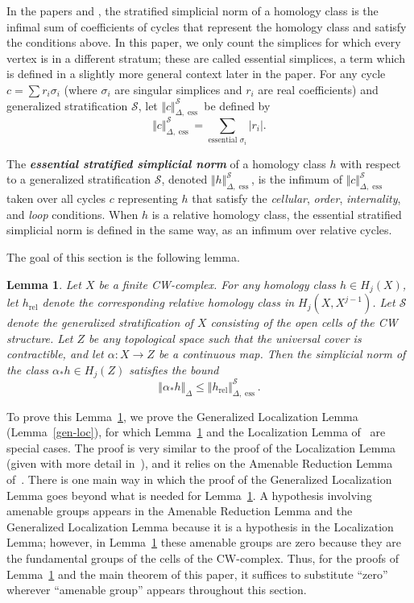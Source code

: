 \documentclass[psamsfonts]{amsart}
\newtheorem{lemma}[theorem]{Lemma}
\theoremstyle{remark}
\newcommand{\abs}[1]{\left\lvert #1 \right\rvert}
\DeclareMathOperator{\ess}{ess}
\DeclareMathOperator{\rel}{rel}
\begin{document}
In the papers \cite{Gromov09} and \cite{Alpert15}, the stratified simplicial norm of a homology class is the infimal sum of coefficients of cycles that represent the homology class and satisfy the conditions above.  In this paper, we only count the simplices for which every vertex is in a different stratum; these are called essential simplices, a term which is defined in a slightly more general context later in the paper.  For any cycle $c = \sum r_i \sigma_i$ (where $\sigma_i$ are singular simplices and $r_i$ are real coefficients) and generalized stratification $\mathcal{S}$, let $\Vert c \Vert_{\Delta, \ess}^{\mathcal{S}}$ be defined by
\[\Vert c \Vert_{\Delta, \ess}^{\mathcal{S}} = \sum_{\text{essential }\sigma_i} \abs{r_i}.\]

The \textbf{\emph{essential stratified simplicial norm}} of a homology class $h$ with respect to a generalized stratification $\mathcal{S}$, denoted $\Vert h \Vert_{\Delta, \ess}^{\mathcal{S}}$, is the infimum of $\Vert c \Vert_{\Delta, \ess}^{\mathcal{S}}$ taken over all cycles $c$ representing $h$ that satisfy the \emph{cellular}, \emph{order}, \emph{internality}, and \emph{loop} conditions.  When $h$ is a relative homology class, the essential stratified simplicial norm is defined in the same way, as an infimum over relative cycles.

The goal of this section is the following lemma.

\begin{lemma}\label{simplicial-goal}
Let $X$ be a finite CW-complex.  For any homology class $h \in H_j(X)$, let $h_{\rel}$ denote the corresponding relative homology class in $H_j(X, X^{j-1})$.  Let $\mathcal{S}$ denote the generalized stratification of $X$ consisting of the open cells of the CW structure.  Let $Z$ be any topological space such that the universal cover is contractible, and let $\alpha : X \rightarrow Z$ be a continuous map.  Then the simplicial norm of the class $\alpha_*h \in H_j(Z)$ satisfies the bound
\[\Vert \alpha_* h \Vert_{\Delta} \leq \Vert h_{\rel} \Vert_{\Delta, \ess}^{\mathcal{S}}.\]
\end{lemma}

To prove this Lemma~\ref{simplicial-goal}, we prove the Generalized Localization Lemma (Lemma~\ref{gen-loc}), for which Lemma~\ref{simplicial-goal} and the Localization Lemma of~\cite{Gromov09} are special cases.  The proof is very similar to the proof of the Localization Lemma (given with more detail in~\cite{Alpert15}), and it relies on the Amenable Reduction Lemma of~\cite{Gromov09}.  There is one main way in which the proof of the Generalized Localization Lemma goes beyond what is needed for Lemma~\ref{simplicial-goal}.  A hypothesis involving amenable groups appears in the Amenable Reduction Lemma and the Generalized Localization Lemma because it is a hypothesis in the Localization Lemma; however, in Lemma~\ref{simplicial-goal} these amenable groups are zero because they are the fundamental groups of the cells of the CW-complex.  Thus, for the proofs of Lemma~\ref{simplicial-goal} and the main theorem of this paper, it suffices to substitute ``zero'' wherever ``amenable group'' appears throughout this section.
\end{document}
